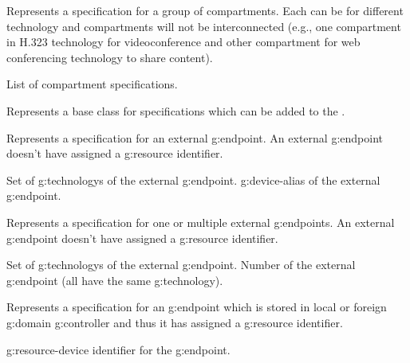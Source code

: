 \begin{Api}
Represents a specification for a group of compartments. Each can be for different technology 
and compartments will not be interconnected (e.g., one compartment in H.323 technology for 
videoconference and other compartment for web conferencing technology to share content).
\begin{ApiClassAttributes}
 List of compartment specifications.
\end{ApiClassAttributes}

Represents a base class for specifications which can be added to the .

Represents a specification for an external \gls{g:endpoint}. An external \gls{g:endpoint} doesn't have assigned a \gls{g:resource} identifier.
\begin{ApiClassAttributes}
 Set of \glspl{g:technology} of the external \gls{g:endpoint}.
 \Gls{g:device-alias} of the external \gls{g:endpoint}.
\end{ApiClassAttributes}

Represents a specification for one or multiple external \glspl{g:endpoint}. An external \gls{g:endpoint} doesn't have assigned a \gls{g:resource} identifier.
\begin{ApiClassAttributes}
 Set of \glspl{g:technology} of the external \gls{g:endpoint}.
 Number of the external \gls{g:endpoint} (all have the same \gls{g:technology}).
\end{ApiClassAttributes}

Represents a specification for an \gls{g:endpoint} which is stored in local or foreign \gls{g:domain} \gls{g:controller} and thus it has assigned a \gls{g:resource} identifier.
\begin{ApiClassAttributes}
 \Gls{g:resource-device} identifier for the \gls{g:endpoint}.
\end{ApiClassAttributes}


\end{Api}
